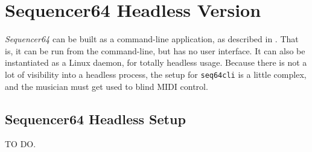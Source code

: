 %
%
%

\section{Sequencer64 Headless Version}
\label{sec:headless}

   \textsl{Sequencer64} can be built as a command-line application,
   as described in .
   That is, it can be run from the command-line, but has no user interface.
   It can also be instantiated as a Linux daemon, for totally headless usage.
   Because there is not a lot of visibility into a headless process, the
   setup for \texttt{seq64cli} is a little complex, and the musician must get
   used to blind MIDI control.

\subsection{Sequencer64 Headless Setup}
\label{subsec:headless_setup}

   TO DO.

